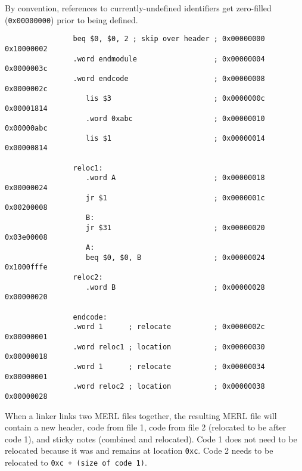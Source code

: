 \documentclass[]{article}
\theoremstyle{definition}
\begin{document}
			By convention, references to currently-undefined identifiers get zero-filled (\verb+0x00000000+) prior to being defined.
			\begin{verbatim}
				beq $0, $0, 2 ; skip over header ; 0x00000000  0x10000002
				.word endmodule                  ; 0x00000004  0x0000003c
				.word endcode                    ; 0x00000008  0x0000002c
				   lis $3                        ; 0x0000000c  0x00001814
				   .word 0xabc                   ; 0x00000010  0x00000abc
				   lis $1                        ; 0x00000014  0x00000814

				reloc1: 
				   .word A                       ; 0x00000018  0x00000024
				   jr $1                         ; 0x0000001c  0x00200008
				   B:                                               
				   jr $31                        ; 0x00000020  0x03e00008
				   A:                                               
				   beq $0, $0, B                 ; 0x00000024  0x1000fffe
				reloc2: 
				   .word B                       ; 0x00000028  0x00000020

				endcode:
				.word 1      ; relocate          ; 0x0000002c  0x00000001
				.word reloc1 ; location          ; 0x00000030  0x00000018
				.word 1      ; relocate          ; 0x00000034  0x00000001
				.word reloc2 ; location          ; 0x00000038  0x00000028
			\end{verbatim}
			When a linker links two MERL files together, the resulting MERL file will contain a new header, code from file 1, code from file 2 (relocated to be after code 1), and sticky notes (combined and relocated). Code 1 does not need to be relocated because it was and remains at location \verb+0xc+. Code 2 needs to be relocated to \verb.0xc + (size of code 1)..
\end{document}
